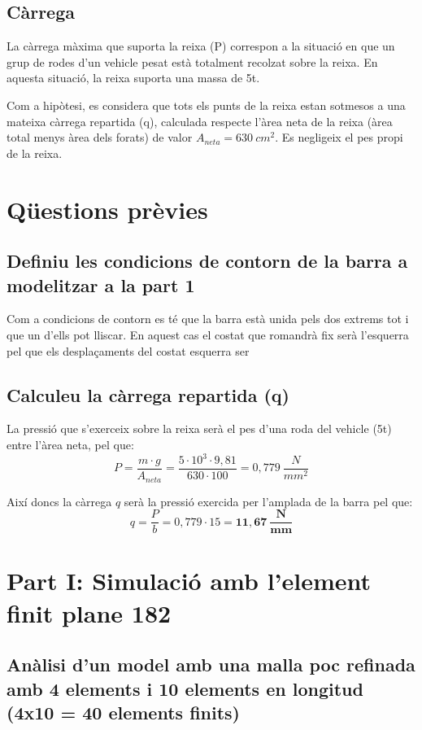 \documentclass[a4paper]{article}
\begin{document}
\subsection{Càrrega}
La càrrega màxima que suporta la reixa (P) correspon a la situació en que un grup de rodes d'un vehicle pesat està totalment recolzat sobre la reixa. En aquesta situació, la reixa suporta una massa de 5t.

Com a hipòtesi, es considera que tots els punts de la reixa estan sotmesos a una mateixa càrrega repartida (q), calculada respecte l'àrea neta de la reixa (àrea total menys àrea dels forats) de valor $A_{neta} = 630 \ cm^2$. Es negligeix el pes propi de la reixa.

\section{Qüestions prèvies}
\subsection{Definiu les condicions de contorn de la barra a modelitzar a la part 1}

Com a condicions de contorn es té que la barra està unida pels dos extrems tot i que un d'ells pot lliscar. En aquest cas el costat que romandrà fix serà l'esquerra pel que els desplaçaments del costat esquerra ser

\subsection{Calculeu la càrrega repartida (q)}

La pressió que s'exerceix sobre la reixa serà el pes d'una roda del vehicle (5t) entre l'àrea neta, pel que:
$$
P = \frac{m \cdot g}{A_{neta}} = \frac{5\cdot10^3 \cdot 9,81}{630 \cdot 100} = 0,779\ \frac{N}{mm^2}
$$

Així doncs la càrrega $q$ serà la pressió exercida per l'amplada de la barra pel que:
$$
q = \frac{P}{b} = 0,779 \cdot 15 = \boldsymbol{11,67 \ \frac{N}{mm}} 
$$

\section{Part I: Simulació amb l'element finit plane 182}

\subsection{Anàlisi d'un model amb una malla poc refinada amb 4 elements i 10 elements en longitud (4x10 = 40 elements finits)}
\end{document}

